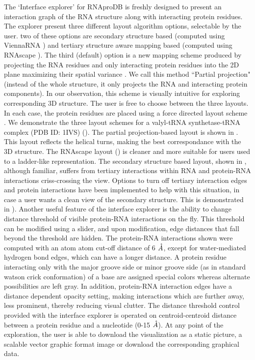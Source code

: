 The `Interface explorer' for RNAproDB is freshly designed to present an interaction graph of the RNA structure along with interacting protein residues. The explorer present three different layout algorithm options, selectable by the user. two of these options are secondary structure based (computed using ViennaRNA \citep{Lorenz2011}) and tertiary structure aware mapping based (computed using RNAscape \citep{Mitra2024rnascape}). The third (default) option is a new mapping scheme produced by projecting the RNA residues and only interacting protein residues into the 2D plane maximizing their spatial variance \citep{Pearson1901}. We call this method ``Partial projection" (instead of the whole structure, it only projects the RNA and interacting protein components). In our observation, this scheme is visually intuitive for exploring corresponding 3D structure. The user is free to choose between the three layouts. In each case, the protein residues are placed using a force directed layout scheme \citep{bostock2012fl}. We demonstrate the three layout schemes for a valyl-tRNA synthetase-tRNA complex (PDB ID: 1IVS) (). The partial projection-based layout is shown in . This layout reflects the helical turns, making the best correspondance with the 3D structure. The RNAscape \citep{Mitra2024rnascape} layout () is cleaner and more suitable for users used to a ladder-like representation.  The secondary structure based layout, shown in , although familiar, suffers from tertiary interactions within RNA and protein-RNA interactions criss-crossing the view. Options to turn off tertiary interaction edges and protein interactions have been implemented to help with this situation, in case a user wants a clean view of the secondary structure. This is demonstrated in ). Another useful feature of the interface explorer is the ability to change distance threshold of visible protein-RNA interactions on the fly. This threshold can be modified using a slider, and upon modification, edge distances that fall beyond the threshold are hidden. The protein-RNA interactions shown were computed with an atom atom cut-off distance of 6 $\AA$, except for water-mediated hydrogen bond edges, which can have a longer distance. A protein residue interacting only with the major groove side or minor groove side (as in standard watson crick conformation) of a base are assigned special colors whereas alternate possibilities are left gray. In addition, protein-RNA interaction edges have a distance dependent opacity setting, making interactions which are further away, less prominent, thereby reducing visual clutter.
The distance threshold control provided with the interface explorer is operated on centroid-centroid distance between a protein residue and a nucleotide (0-15 $\AA$). At any point of the exploration, the user is able to download the visualization as a static picture, a scalable vector graphic format image or download the corresponding graphical data.

